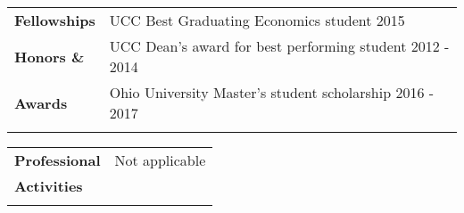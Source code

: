 \documentclass[final]{article}
\begin{document}
\begin{tabular}{@{} l l}
 \Large\textbf {Fellowships}    &  \hspace{4.5ex} UCC Best Graduating Economics student \hspace{17.5ex} 2015 \\
     \Large\textbf {Honors \&} & \hspace{4.5ex} UCC Dean's award for best performing student \hspace{12ex} 2012 - 2014 \\
    \Large\textbf {Awards} & \hspace{4.5ex} Ohio University Master's student scholarship \hspace{14.5ex} 2016 - 2017\\
     & \\
    \end{tabular}


\begin{tabular}{@{} l l}
 \Large\textbf {Professional}    &  \hspace{3ex} Not applicable\\
     \Large\textbf {Activities}\\
     & \\
    \end{tabular}


\end{document}
